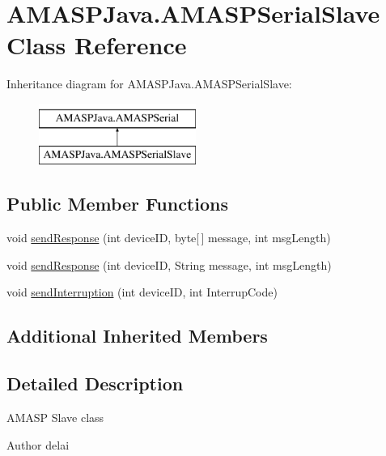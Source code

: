 \hypertarget{class_a_m_a_s_p_java_1_1_a_m_a_s_p_serial_slave}{}\section{A\+M\+A\+S\+P\+Java.\+A\+M\+A\+S\+P\+Serial\+Slave Class Reference}
\label{class_a_m_a_s_p_java_1_1_a_m_a_s_p_serial_slave}
Inheritance diagram for A\+M\+A\+S\+P\+Java.\+A\+M\+A\+S\+P\+Serial\+Slave\+:\begin{figure}[H]
\begin{center}
\leavevmode
\includegraphics[height=2.000000cm]{class_a_m_a_s_p_java_1_1_a_m_a_s_p_serial_slave}
\end{center}
\end{figure}
\subsection*{Public Member Functions}
\begin{DoxyCompactItemize}
\item 
void \hyperlink{class_a_m_a_s_p_java_1_1_a_m_a_s_p_serial_slave_ac1a33dcf4cc36f5e98b6a212125152f1}{send\+Response} (int device\+ID, byte\mbox{[}$\,$\mbox{]} message, int msg\+Length)
\item 
void \hyperlink{class_a_m_a_s_p_java_1_1_a_m_a_s_p_serial_slave_a4946c9cd7c4691d5d94096fe07d12619}{send\+Response} (int device\+ID, String message, int msg\+Length)
\item 
void \hyperlink{class_a_m_a_s_p_java_1_1_a_m_a_s_p_serial_slave_aa6185a4c4745e701c2eee36dbc577a99}{send\+Interruption} (int device\+ID, int Interrup\+Code)
\end{DoxyCompactItemize}
\subsection*{Additional Inherited Members}


\subsection{Detailed Description}
A\+M\+A\+SP Slave class \begin{DoxyAuthor}{Author}
delai 
\end{DoxyAuthor}


